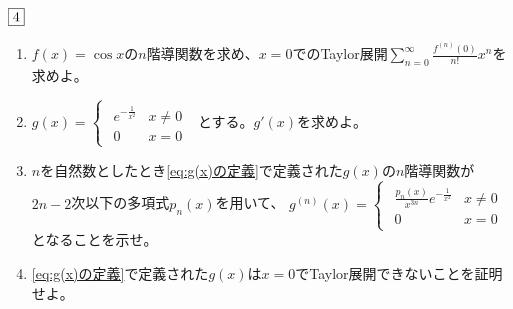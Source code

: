 \begin{tcolorbox} %
	$\fbox{4}$
\begin{enumerate}
	\item $f(x)= \cos{x}$の$n$階導関数を求め、$x= 0$でのTaylor展開$\sum_{n= 0}^\infty \frac{f^{(n)}(0)}{n!}x^n$を求めよ。
	\item\label{eq:g(x)の定義} $
	g(x)= 
\begin{cases}
\begin{matrix}
	e^{-\frac{1}{x^2}}& x\ne 0\\
	0& x= 0
\end{matrix}
\end{cases}
$
	とする。$g'(x)$を求めよ。
	\item $n$を自然数としたとき\eqref{eq:g(x)の定義}で定義された$g(x)$の$n$階導関数が$2n- 2$次以下の多項式$p_n(x)$を用いて、
$
	g^{(n)}(x)=
\begin{cases}
\begin{matrix}
	\frac{p_n(x)}{x^{3n}}e^{-\frac{1}{x^2}}& x\ne 0\\
	0& x= 0
\end{matrix}
\end{cases}
$
	となることを示せ。
	\item \eqref{eq:g(x)の定義}で定義された$g(x)$は$x= 0$でTaylor展開できないことを証明せよ。
\end{enumerate}
\end{tcolorbox}

